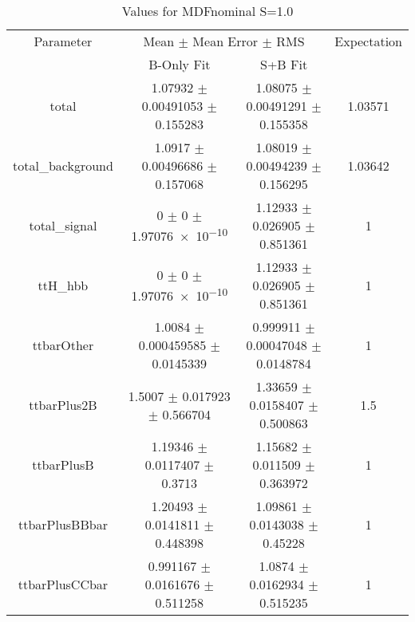 \begin{table}
\centering
\caption{Values for MDFnominal S=1.0}
\begin{tabular}{cccc}
\toprule
Parameter & \multicolumn{2}{c}{Mean $\pm$ Mean Error $\pm$ RMS} & Expectation\\
 & B-Only Fit & S+B Fit & \\
\midrule
total & \num{1.07932} $\pm$ \num{0.00491053} $\pm$ \num{0.155283} & \num{1.08075} $\pm$ \num{0.00491291} $\pm$ \num{0.155358} & \num{1.03571}\\
total\_background & \num{1.0917} $\pm$ \num{0.00496686} $\pm$ \num{0.157068} & \num{1.08019} $\pm$ \num{0.00494239} $\pm$ \num{0.156295} & \num{1.03642}\\
total\_signal & \num{0} $\pm$ \num{0} $\pm$ \num{1.97076e-10} & \num{1.12933} $\pm$ \num{0.026905} $\pm$ \num{0.851361} & \num{1}\\
ttH\_hbb & \num{0} $\pm$ \num{0} $\pm$ \num{1.97076e-10} & \num{1.12933} $\pm$ \num{0.026905} $\pm$ \num{0.851361} & \num{1}\\
ttbarOther & \num{1.0084} $\pm$ \num{0.000459585} $\pm$ \num{0.0145339} & \num{0.999911} $\pm$ \num{0.00047048} $\pm$ \num{0.0148784} & \num{1}\\
ttbarPlus2B & \num{1.5007} $\pm$ \num{0.017923} $\pm$ \num{0.566704} & \num{1.33659} $\pm$ \num{0.0158407} $\pm$ \num{0.500863} & \num{1.5}\\
ttbarPlusB & \num{1.19346} $\pm$ \num{0.0117407} $\pm$ \num{0.3713} & \num{1.15682} $\pm$ \num{0.011509} $\pm$ \num{0.363972} & \num{1}\\
ttbarPlusBBbar & \num{1.20493} $\pm$ \num{0.0141811} $\pm$ \num{0.448398} & \num{1.09861} $\pm$ \num{0.0143038} $\pm$ \num{0.45228} & \num{1}\\
ttbarPlusCCbar & \num{0.991167} $\pm$ \num{0.0161676} $\pm$ \num{0.511258} & \num{1.0874} $\pm$ \num{0.0162934} $\pm$ \num{0.515235} & \num{1}\\
\bottomrule
\end{tabular}
\end{table}